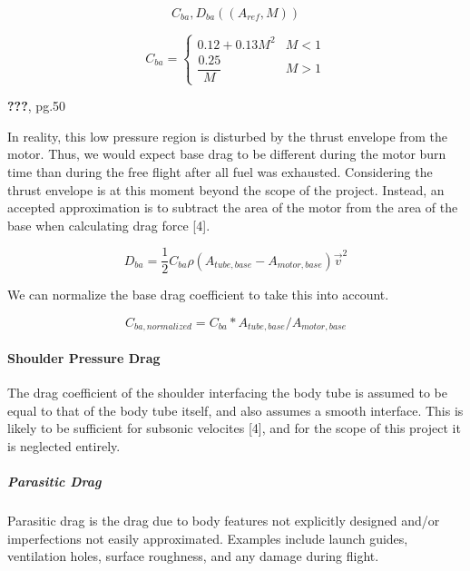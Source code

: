 \documentclass[]{article}
\let\oldparagraph\paragraph
\renewcommand{\paragraph}[1]{\oldparagraph{#1}\mbox{}}
\let\oldsubparagraph\subparagraph
\renewcommand{\subparagraph}[1]{\oldsubparagraph{#1}\mbox{}}
\begin{document}
\begin{equation}
C_{ba}, D_{ba} ((A_{ref}, M)) 
\end{equation}

\begin{equation}
\label{eq_base_drag_coefficient}
C_{ba} = 
\begin{cases}
0.12+0.13 M^2   & M < 1 \\
\dfrac{0.25}{M} & M > 1
\end{cases}
\end{equation}

{\textbf{???}}, pg.50

In reality, this low pressure region is disturbed by the thrust envelope
from the motor. Thus, we would expect base drag to be different during
the motor burn time than during the free flight after all fuel was
exhausted. Considering the thrust envelope is at this moment beyond the
scope of the project. Instead, an accepted approximation is to subtract
the area of the motor from the area of the base when calculating drag
force {[}4{]}.

\begin{equation}
\label{eq_base_drag_force}
D_{ba} = \dfrac{1}{2} C_{ba} \rho (A_{tube,base} - A_{motor,base}) \vec{v}^2 
\end{equation}

We can normalize the base drag coefficient to take this into account.

\begin{equation}
\label{eq_base_drag_coefficient_normalized}
C_{ba,normalized} =
C_{ba} * A_{tube,base}/A_{motor,base}
\end{equation}

\paragraph{Shoulder Pressure Drag}\label{shoulder-pressure-drag}

The drag coefficient of the shoulder interfacing the body tube is
assumed to be equal to that of the body tube itself, and also assumes a
smooth interface. This is likely to be sufficient for subsonic velocites
{[}4{]}, and for the scope of this project it is neglected entirely.

\subparagraph{Parasitic Drag}\label{parasitic-drag}

Parasitic drag is the drag due to body features not explicitly designed
and/or imperfections not easily approximated. Examples include launch
guides, ventilation holes, surface roughness, and any damage during
flight.
\end{document}
